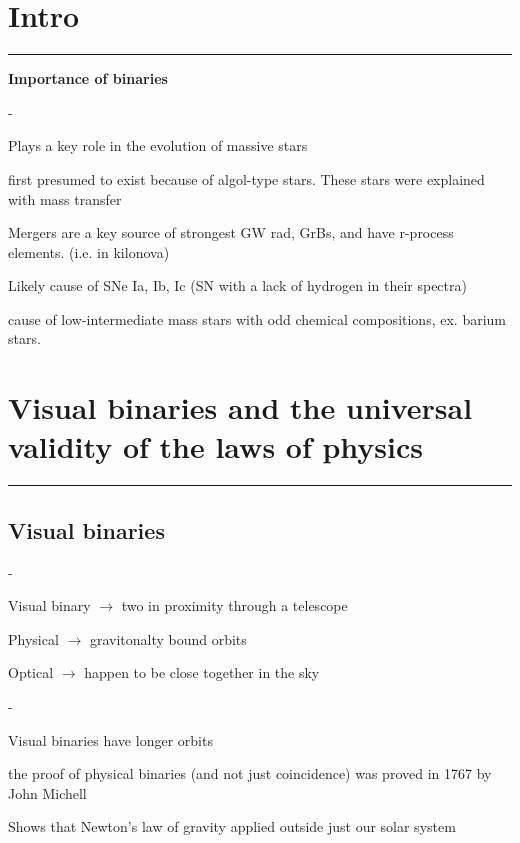 \chapter{Intro}
\hrule
\vspace{.5cm}

\noindent \textbf{\large Importance of binaries}
\begin{list}{-}{}
\item Plays a key role in the evolution of massive stars
\item first presumed to exist because of \gls{algol-type} stars. These stars were explained with mass transfer
\item Mergers are a key source of strongest GW rad, GrBs, and have r-process elements. (i.e. in \gls{kilonova}) 
\item Likely cause of SNe Ia, Ib, Ic (SN with a lack of hydrogen in their spectra) 
\item cause of low-intermediate mass stars with odd chemical compositions, ex. barium stars. 
\end{list}

\pagebreak
\chapter{Visual binaries and the universal validity of the laws of physics}
\hrule
\vspace{.5cm}


\section{Visual binaries}
\begin{list}{-}{}

\item Visual binary \(\rightarrow\) two in proximity through a telescope

\item Physical \(\rightarrow\) gravitonalty bound orbits

\item Optical \(\rightarrow\) happen to be close together in the sky

\end{list}

\begin{list}{-}{}
\item Visual binaries have longer orbits
\item the proof of physical binaries (and not just coincidence) was proved in 1767 by John Michell
\item Shows that Newton's law of gravity applied outside just our solar system
\end{list}
